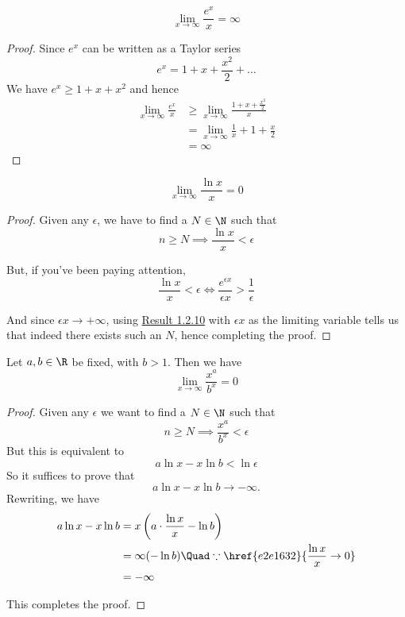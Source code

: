 \label{b905ee7}
$$
	\lim_{x\to\infty}\frac{e^x}x=\infty
$$

\begin{proof}
	Since $e^x$ can be written as a Taylor series
	$$
		e^x=1 + x + \frac{x^2}2 +\ldots
	$$
	We have $e^x\geq 1 + x + x^2$ and hence
	\begin{align*}
		\lim_{x\to\infty}\frac{e^x}x
		 & \geq\lim_{x\to\infty}\frac{1+x+\frac{x^2}2}x \\
		 & =\lim_{x\to\infty}\frac1x + 1 + \frac{x}2    \\
		 & = \infty
	\end{align*}
\end{proof}


\label{e2e1632}
$$
	\lim_{x\to\infty}\frac{\ln x}x = 0
$$

\begin{proof}
	Given any $\epsilon$, we have to find a $N\in\N$ such that
	$$
		n\geq N\implies\frac{\ln x}x<\epsilon
	$$

	But, if you've been paying attention,
	$$
		\frac{\ln x}x<\epsilon\iff\frac{e^{\epsilon x}}{\epsilon x}>\frac1\epsilon
	$$

	And since $\epsilon x\to+\infty$, using \href{b905ee7}{Result
		1.2.10} with $\epsilon x$ as the limiting variable tells us that
	indeed there exists such an $N$, hence completing the proof.
\end{proof}

\label{f3540b0}

Let $a,b\in\R$ be fixed, with $b>1$. Then we have
$$
	\lim_{x\to\infty}\frac{x^a}{b^x}=0
$$

\begin{proof}
	Given any $\epsilon$ we want to find a $N\in\N$ such that
	$$
		n\geq N\implies\frac{x^a}{b^x}<\epsilon
	$$
	But this is equivalent to
	$$
		a\ln x-x\ln b<\ln\epsilon
	$$
	So it suffices to prove that
	$$
		a\ln x-x\ln b\to-\infty.
	$$
	Rewriting, we have
	\begin{align*}
		a\ln x-x\ln b
		 & = x\left(a\cdot\frac{\ln x}{x}-\ln b\right)                       \\
		 & = \infty(-\ln b) \Quad\because\href{e2e1632}{\frac{\ln x}{x}\to0} \\
		 & = -\infty
	\end{align*}

	This completes the proof.
\end{proof}


